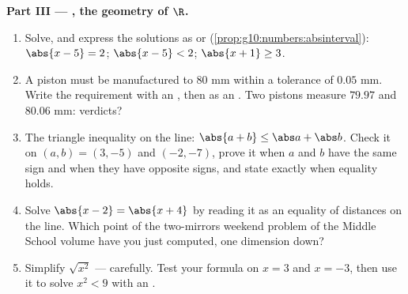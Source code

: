 \begin{problem}
\medskip
\noindent\textbf{Part III --- , the geometry of
$\R$.}
\begin{enumerate}[resume]
  \item Solve, and express the solutions as  or 
        (\cref{prop:g10:numbers:absinterval}):
        $\abs{x - 5} = 2$; \quad $\abs{x - 5} < 2$; \quad
        $\abs{x + 1} \geq 3$.
  \item A piston must be manufactured to $80$ mm within a
        tolerance of $0.05$ mm. Write the requirement with an
        , then as an . Two pistons measure
        $79.97$ and $80.06$ mm: verdicts?
  \item The triangle inequality on the line:
        $\abs{a + b} \leq \abs a + \abs b$. Check it on
        $(a, b) = (3, -5)$ and $(-2, -7)$, prove it when $a$ and
        $b$ have the same sign and when they have opposite
        signs, and state exactly when equality holds.
  \item Solve $\abs{x - 2} = \abs{x + 4}$ by reading it as an
        equality of distances on the line. Which point of
        the two-mirrors weekend problem of the Middle School volume have you just computed, one
        dimension down?
  \item Simplify $\sqrt{x^2}$ --- carefully. Test your formula
        on $x = 3$ and $x = -3$, then use it to solve
        $x^2 < 9$ with an .
\end{enumerate}


\end{problem}
